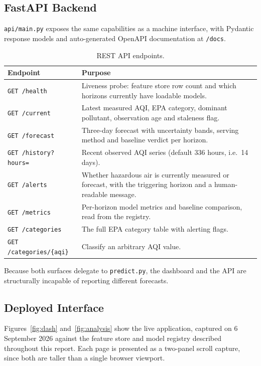 \documentclass[11pt,a4paper]{article}
\begin{document}
\subsection{FastAPI Backend}

\texttt{api/main.py} exposes the same capabilities as a machine interface,
with Pydantic response models and auto-generated OpenAPI documentation at
\texttt{/docs}.

\begin{table}[H]
\centering
\caption{REST API endpoints.}
\label{tab:api}
\small
\begin{tabular}{@{}p{4.1cm}p{10.2cm}@{}}
\toprule
\textbf{Endpoint} & \textbf{Purpose}\\
\midrule
\texttt{GET /health} & Liveness probe: feature store row count and which
horizons currently have loadable models.\\
\texttt{GET /current} & Latest measured AQI, EPA category, dominant
pollutant, observation age and staleness flag.\\
\texttt{GET /forecast} & Three-day forecast with uncertainty bands, serving
method and baseline verdict per horizon.\\
\texttt{GET /history?hours=} & Recent observed AQI series (default 336 hours,
i.e.\ 14 days).\\
\texttt{GET /alerts} & Whether hazardous air is currently measured or
forecast, with the triggering horizon and a human-readable message.\\
\texttt{GET /metrics} & Per-horizon model metrics and baseline comparison,
read from the registry.\\
\texttt{GET /categories} & The full EPA category table with alerting flags.\\
\texttt{GET /categories/\{aqi\}} & Classify an arbitrary AQI value.\\
\bottomrule
\end{tabular}
\end{table}

Because both surfaces delegate to \texttt{predict.py}, the dashboard and the
API are structurally incapable of reporting different forecasts.

\subsection{Deployed Interface}

Figures~\ref{fig:dash} and~\ref{fig:analysis} show the live application,
captured on 6 September 2026 against the feature store and model registry
described throughout this report. Each page is presented as a two-panel scroll
capture, since both are taller than a single browser viewport.
\end{document}
